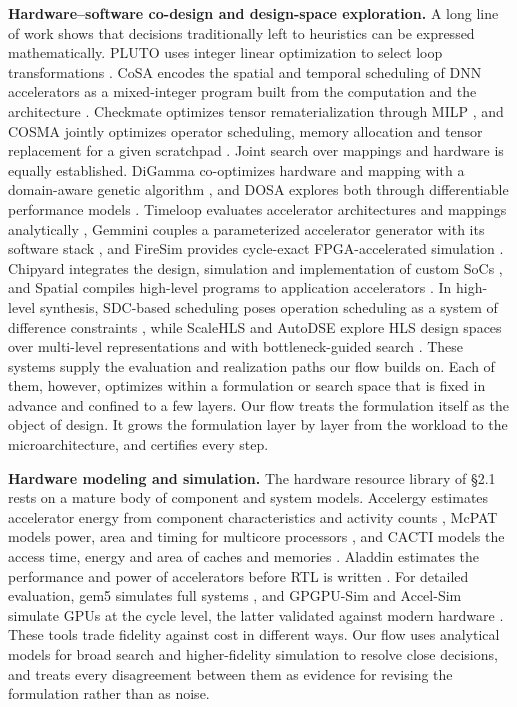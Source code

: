 \documentclass[11pt]{article}
\begin{document}
\textbf{Hardware--software co-design and design-space exploration.} A long line of work shows that decisions traditionally left to heuristics can be expressed mathematically. PLUTO uses integer linear optimization to select loop transformations \cite{r28}. CoSA encodes the spatial and temporal scheduling of DNN accelerators as a mixed-integer program built from the computation and the architecture \cite{r9}. Checkmate optimizes tensor rematerialization through MILP \cite{r15}, and COSMA jointly optimizes operator scheduling, memory allocation and tensor replacement for a given scratchpad \cite{r16}. Joint search over mappings and hardware is equally established. DiGamma co-optimizes hardware and mapping with a domain-aware genetic algorithm \cite{r17}, and DOSA explores both through differentiable performance models \cite{r10}. Timeloop evaluates accelerator architectures and mappings analytically \cite{r18}, Gemmini couples a parameterized accelerator generator with its software stack \cite{r19}, and FireSim provides cycle-exact FPGA-accelerated simulation \cite{r20}. Chipyard integrates the design, simulation and implementation of custom SoCs \cite{r83}, and Spatial compiles high-level programs to application accelerators \cite{r84}. In high-level synthesis, SDC-based scheduling poses operation scheduling as a system of difference constraints \cite{r87}, while ScaleHLS and AutoDSE explore HLS design spaces over multi-level representations and with bottleneck-guided search \cite{r85,r86}. These systems supply the evaluation and realization paths our flow builds on. Each of them, however, optimizes within a formulation or search space that is fixed in advance and confined to a few layers. Our flow treats the formulation itself as the object of design. It grows the formulation layer by layer from the workload to the microarchitecture, and certifies every step.

\textbf{Hardware modeling and simulation.} The hardware resource library of §2.1 rests on a mature body of component and system models. Accelergy estimates accelerator energy from component characteristics and activity counts \cite{r54}, McPAT models power, area and timing for multicore processors \cite{r55}, and CACTI models the access time, energy and area of caches and memories \cite{r56}. Aladdin estimates the performance and power of accelerators before RTL is written \cite{r57}. For detailed evaluation, gem5 simulates full systems \cite{r58}, and GPGPU-Sim and Accel-Sim simulate GPUs at the cycle level, the latter validated against modern hardware \cite{r59,r60}. These tools trade fidelity against cost in different ways. Our flow uses analytical models for broad search and higher-fidelity simulation to resolve close decisions, and treats every disagreement between them as evidence for revising the formulation rather than as noise.
\end{document}
